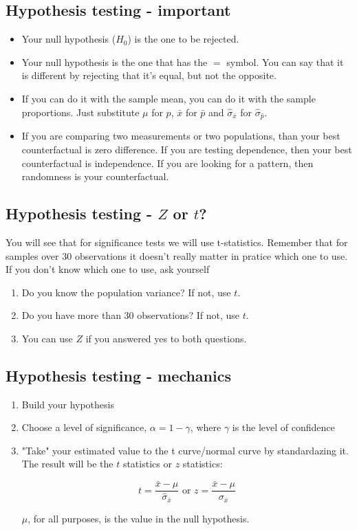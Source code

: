 \documentclass[11pt]{article}
\begin{document}
	\subsection*{Hypothesis testing - important}
	\begin{itemize}
		\item Your null hypothesis ($H_0$) is the one to be rejected.
		\item Your null hypothesis is the one that has the $=$ symbol. You can say that it is different by rejecting that it's equal, but not the opposite.
		\item If you can do it with the sample mean, you can do it with the sample proportions. Just substitute $\mu$ for $p$, $\bar{x}$ for $\bar{p}$ and $\hat{\sigma}_{\bar{x}}$ for $\hat{\sigma}_{\hat{p}}$.
		\item If you are comparing two measurements or two populations, than your best counterfactual is zero difference. If you are testing dependence, then your best counterfactual is independence. If you are looking for a pattern, then randomness is your counterfactual.
	\end{itemize}

	\subsection*{Hypothesis testing - $Z$ or $t$?}
	You will see that for significance tests we will use t-statistics. Remember that for samples over 30 observations it doesn't really matter in pratice which one to use. If you don't know which one to use, ask yourself
	\begin{enumerate}
		\item Do you know the population variance? If not, use $t$.
		\item Do you have more than 30 observations? If not, use $t$.
		\item You can use $Z$ if you answered yes to both questions.
	\end{enumerate}


	\subsection*{Hypothesis testing - mechanics}
	\begin{enumerate}
		\item Build your hypothesis
		\item Choose a level of significance, $\alpha = 1 - \gamma$, where $\gamma$ is the level of confidence
		\item "Take" your estimated value to the t curve/normal curve by standardazing it. The result will be the $t$ statistics or $z$ statistics:

		\[t = \frac{\bar{x} - \mu}{\hat{\sigma}_{\bar{x}}} \text{ or } z = \frac{\bar{x} - \mu}{\sigma_{\bar{x}}}\]

		$\mu$, for all purposes, is the value in the null hypothesis. 
	\end{enumerate}
\end{document}
